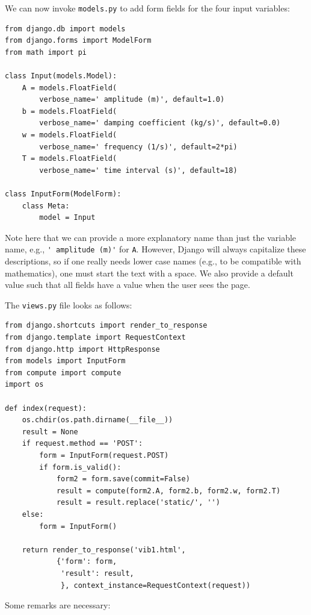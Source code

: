 \documentclass[%
oneside,                 %
final,                   %
10pt]{article}
\begin{document}
\noindent
{}

We can now invoke \Verb!models.py! to add form fields for the four
input variables:

\begin{Verbatim}[numbers=none,fontsize=\fontsize{9pt}{9pt},baselinestretch=0.85]
from django.db import models
from django.forms import ModelForm
from math import pi

class Input(models.Model):
    A = models.FloatField(
        verbose_name=' amplitude (m)', default=1.0)
    b = models.FloatField(
        verbose_name=' damping coefficient (kg/s)', default=0.0)
    w = models.FloatField(
        verbose_name=' frequency (1/s)', default=2*pi)
    T = models.FloatField(
        verbose_name=' time interval (s)', default=18)

class InputForm(ModelForm):
    class Meta:
        model = Input
\end{Verbatim}
Note here that we can provide a more explanatory name than just
the variable name, e.g., \Verb!' amplitude (m)'! for \Verb!A!. However,
Django will always capitalize these descriptions, so if one really
needs lower case names (e.g., to be compatible with mathematics),
one must start the text with a space. We also provide a default
value such that all fields have a value when the user sees
the page.


The \Verb!views.py! file looks as follows:

\begin{Verbatim}[numbers=none,fontsize=\fontsize{9pt}{9pt},baselinestretch=0.85]
from django.shortcuts import render_to_response
from django.template import RequestContext
from django.http import HttpResponse
from models import InputForm
from compute import compute
import os

def index(request):
    os.chdir(os.path.dirname(__file__))
    result = None
    if request.method == 'POST':
        form = InputForm(request.POST)
        if form.is_valid():
            form2 = form.save(commit=False)
            result = compute(form2.A, form2.b, form2.w, form2.T)
            result = result.replace('static/', '')
    else:
        form = InputForm()

    return render_to_response('vib1.html',
            {'form': form,
             'result': result,
             }, context_instance=RequestContext(request))
\end{Verbatim}
Some remarks are necessary:
\end{document}
